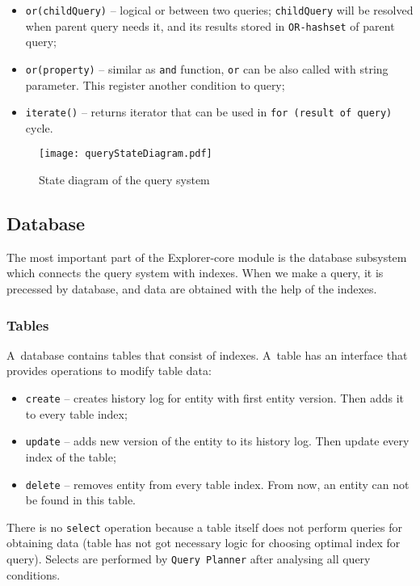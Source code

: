 \begin{itemize}
    \item \texttt{or(childQuery)} -- logical or between two queries; \texttt{childQuery} will be resolved when parent query needs it, and its results stored in \texttt{OR-hashset} of parent query;
    \item \texttt{or(property)} -- similar as \texttt{and} function, \texttt{or} can be also called with string parameter. This register another condition to query;
    \item \texttt{iterate()} -- returns iterator that can be used in \texttt{for (result of query)} cycle.
\end{itemize}


\begin{figure}[h]
    \centering
    \texttt{[image: queryStateDiagram.pdf]}
    \caption{State diagram of the query system}
    \label{queryStateDiagram}
\end{figure}


\subsection{Database}
The most important part of the Explorer-core module is the database subsystem which connects the query system with indexes. When we make a query, it is precessed by database, and data are obtained with the help of the indexes.

\subsubsection{Tables}
A~database contains tables that consist of indexes. A~table has an interface that provides operations to modify table data:
\begin{itemize}
    \item \texttt{create} -- creates history log for entity with first entity version. Then adds it to every table index;
    \item \texttt{update} -- adds new version of the entity to its history log. Then update every index of the table;
    \item \texttt{delete} -- removes entity from every table index. From now, an entity can not be found in this table.
\end{itemize}
There is no \texttt{select} operation because a table itself does not perform queries for obtaining data (table has not got necessary logic for choosing optimal index for query). Selects are performed by \texttt{Query Planner} after analysing all query conditions.

